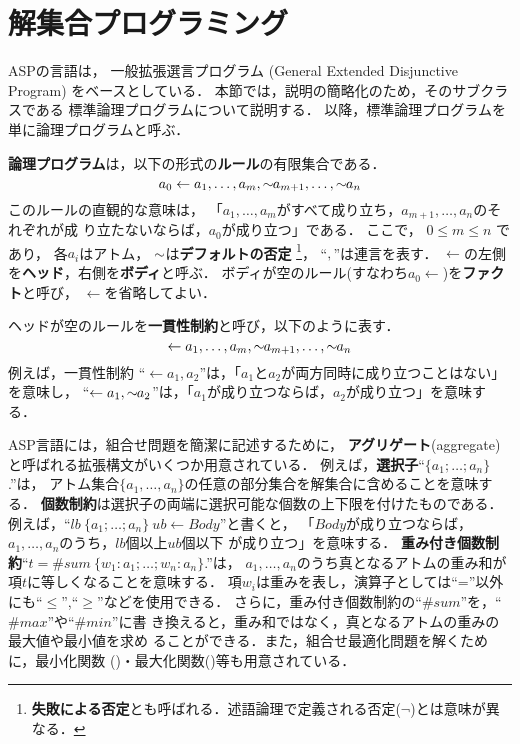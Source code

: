 \section{解集合プログラミング}\label{sec:asp}

ASPの言語は，
一般拡張選言プログラム
(General Extended Disjunctive Program)
をベースとしている\cite{Inoue08:jssst}．
本節では，説明の簡略化のため，そのサブクラスである
標準論理プログラムについて説明する．
以降，標準論理プログラムを単に論理プログラムと呼ぶ．

\textbf{論理プログラム}は，以下の形式の\textbf{ルール}の有限集合である．
\begin{equation}
  \label{eq:rule}
  a_0\leftarrow a_1,\dots,a_m,{\sim\!\!{a_{m+1}}},\dots,{\sim\!\!{a_n}}
\end{equation}
このルールの直観的な意味は，
「$a_1,\ldots,a_m$がすべて成り立ち，$a_{m+1},\ldots,a_n$のそれぞれが成
り立たないならば，$a_0$が成り立つ」である．
ここで，
$0\leq m\leq n$ であり，
各$a_i$はアトム，
${\sim\!\!{}}$は\textbf{デフォルトの否定}
\footnote{\textbf{失敗による否定}とも呼ばれる．述語論理で定義される否定($\neg$)とは意味が異なる．}，
``$,$''は連言を表す．
$\leftarrow$の左側を\textbf{ヘッド}，右側を\textbf{ボディ}と呼ぶ．
ボディが空のルール(すなわち\(a_0\leftarrow\))を\textbf{ファクト}と呼び，
$\leftarrow$を省略してよい．

ヘッドが空のルールを\textbf{一貫性制約}と呼び，以下のように表す．
\begin{equation}
  \label{eq:constr}
  \leftarrow a_1,\dots,a_m,{\sim\!\!{a_{m+1}}},\dots,{\sim\!\!{a_n}}
\end{equation}
例えば，一貫性制約
``\(\leftarrow a_1,a_2\)''は，「$a_1$と$a_2$が両方同時に成り立つことはない」を意味し，
``\(\leftarrow a_1, {\sim\!\!{a_{2}}}\)''は，「$a_1$が成り立つならば，$a_2$が成り立つ」を意味する．

ASP言語には，組合せ問題を簡潔に記述するために，
\textbf{アグリゲート}(aggregate)と呼ばれる拡張構文がいくつか用意されている．
例えば，\textbf{選択子}``$\{a_1;\ldots;a_n\}$.''は，
アトム集合\(\{a_1,\ldots,a_n\}\)の任意の部分集合を解集合に含めることを意味する．
\textbf{個数制約}は選択子の両端に選択可能な個数の上下限を付けたものである．
例えば，``\(lb\ \{a_1;\dots;a_n\}\ ub \leftarrow Body\)''と書くと，
「$Body$が成り立つならば，$a_1,\dots,a_n$のうち，$lb$個以上$ub$個以下
が成り立つ」を意味する．
\textbf{重み付き個数制約}``\(t = \#sum\ \{w_1:a_1;\ldots;w_n:a_n\}\).''は，
$a_1,\dots,a_n$のうち真となるアトムの重み和が項$t$に等しくなることを意味する．
項$w_i$は重みを表し，演算子としては``=''以外にも``$\leq$'',``$\geq$''などを使用できる．
さらに，重み付き個数制約の``$\#sum$''を，``$\#max$''や``$\#min$''に書
き換えると，重み和ではなく，真となるアトムの重みの最大値や最小値を求め
ることができる．また，組合せ最適化問題を解くために，最小化関数
()・最大化関数()等も用意されている．

